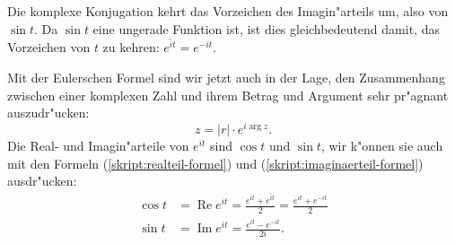 Die komplexe Konjugation kehrt das Vorzeichen des Imagin"arteils um, also 
von $\sin t$. Da $\sin t$ eine ungerade Funktion ist, ist dies gleichbedeutend
damit, das Vorzeichen von $t$ zu kehren: $\overline{e^{it}}=e^{-it}$.

Mit der Eulerschen Formel sind wir jetzt auch in der Lage, den Zusammenhang
zwischen einer komplexen Zahl und ihrem Betrag und Argument sehr pr"agnant
auszudr"ucken:
\[
z=|r|\cdot e^{i\operatorname{arg}z}.
\]
Die Real- und Imagin"arteile von $e^{it}$ sind $\cos t$ und $\sin t$,
wir k"onnen sie auch mit den Formeln (\ref{skript:realteil-formel}) und
(\ref{skript:imaginaerteil-formel}) ausdr"ucken:
\begin{align*}
\cos t
&=
\operatorname{Re}e^{it}
=
\frac{e^{it}+\overline{e^{it}}}2
=
\frac{e^{it}+e^{-it}}2
\\
\sin t
&=
\operatorname{Im}e^{it}=\frac{e^{it}-e^{-it}}{2i}.
\end{align*}

